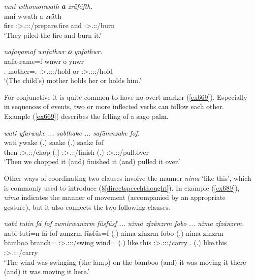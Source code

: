 \begin{exe}
	\ex \emph{mni wthomonwath \textbf{a} zräföfth.}\\
	\gll mni wwath a zräth\\
	fire \Stpl:\Sbj>\Tsg.\F:\Pst:\Pst:\Ipfv/prepare.fire and \Stpl:\Sbj>\Tsg.\F:\Irr:\Pfv/burn\\
	\trans `They piled the fire and burn it.'
	\label{ex667}
\end{exe}
\begin{exe}
	\ex \emph{nafaŋamaf wnfathwr \textbf{o} ynfathwr.}\\
	\gll nafa-ŋame=f wnwr o ynwr\\
	\Third.{\Poss}-mother=\Erg.{\Sg} \Stsg:\Sbj>\Tsg.\F:\Obj:\Nonpast:\Venit/hold or \Stsg:\Sbj>\Tsg.\Masc:\Obj:\Nonpast:\Venit/hold\\
	\trans `(The child's) mother holds her or holds him.'
	\label{ex714}
\end{exe}

For conjunctive  it is quite common to have no overt marker (\ref{ex669}). Especially in sequences of events, two or more inflected verbs can follow each other. Example (\ref{ex669}) describes the felling of a sago palm.

\begin{exe}
	\ex \emph{wati yfarwake ... sabthake ... safümnzake fof.}\\
	\gll wati ywake (.) saake (.) saake fof\\
	then \Fpl:\Sbj>\Tsg.\Masc:\Pst:\Ipfv/chop (.) \Fpl:\Sbj>\Tsg.\Masc:\Pst:\Pfv/finish (.) \Fpl:\Sbj>\Tsg.\Masc:\Pst:\Pfv/pull.over {\Emph}\\
	\trans `Then we chopped it (and) finished it (and) pulled it over.'
	\label{ex669}
\end{exe}

Other ways of coordinating two clauses involve the manner  \emph{nima} `like this', which is commonly used to introduce  ({\S}\ref{directspeechthought}). In example (\ref{ex689}), \emph{nima} indicates the manner of movement (accompanied by an appropriate gesture), but it also connects the two following clauses.

\begin{exe}
	\ex \emph{nabi tutin fä fof zumirwanzrm füsfüsf ... nima zfzänzrm fobo ... nima zfzänzrm.}\\
	\gll nabi tuti=n fä fof zunzrm füsfüs=f (.) nima zfnzrm fobo (.) nima zfnzrm\\
	bamboo branch={\Loc} {\Dist} {\Emph} \Stsg:\Sbj>\Tsg.\F:\Obj:\Pst:\Dur/swing wind={\Erg} (.) {like.this} \Stsg:\Sbj>\Tsg.\F:\Obj:\Pst:\Dur/carry \Dist.{\All} (.) {like.this} \Stsg:\Sbj>\Tsg.\F:\Obj:\Pst:\Dur/carry\\
	\trans `The wind was swinging (the lamp) on the bamboo (and) it was moving it there (and) it was moving it here.'
	\label{ex689}
\end{exe}

